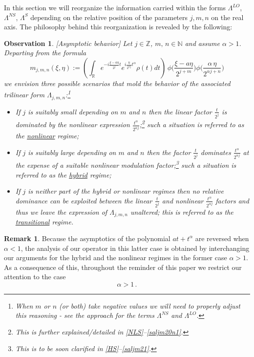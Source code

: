 \documentclass[a4paper,reqno]{amsart}
\numberwithin{equation}{section}
\newtheorem{observation}[theorem]{Observation}
\theoremstyle{definition}
\newtheorem{remark}[theorem]{Remark}
\newcommand{\R}{\mathbb{R}}
\newcommand{\Z}{\mathbb{Z}}
\newcommand{\N}{\mathbb{N}}
\def\a{\alpha}
\def\L{\Lambda}
\begin{document}
In this section we will reorganize the information carried within the forms $\L^{LO}$, $\L^{NS}$, $\L^{S}$ depending on the relative position of the parameters $j,m,n$ on the real axis. The philosophy behind this reorganization is revealed by the following:
\begin{observation}\label{dominance}[\textsf{Asymptotic behavior}] Let $j\in\Z$, $m,\,n\in\N$ and assume $\a>1$. Departing from the formula
\begin{equation}\label{mjmn}
	m_{j,m,n}(\xi,\eta):=\left(\int_\R e^{-i\frac{\xi-a\eta}{2^j}  t}e^{i\frac{\eta}{2^{\a j}}t^\a}\rho(t)dt\right)\,\phi\Big(\frac{\xi-a\eta}{2^{j+m}}\Big)\phi\Big(\frac{\a\,\eta}{2^{\a j+n}}\Big)
\end{equation}
we envision three possible scenarios that mold the behavior of the associated trilinear form $\L_{j,m,n}$:\footnote{When $m$ or $n$ (or both) take negative values we will need to properly adjust this reasoning - see the approach for the terms $\L^{NS}$ and $\L^{LO}$.}
\begin{itemize}
		\item  If $j$ is suitably small depending on $m$ and $n$ then the linear factor $\frac{t}{2^j}$ is dominated by the nonlinear expression $\frac{t^\a}{2^{\a j}}$;\footnote{This is further explained/detailed in \eqref{NLS}--\eqref{saljm20n1}.} such a situation is referred to as the \underline{nonlinear} regime;
        \item If $j$ is suitably large depending on $m$ and $n$ then the factor $\frac{t}{2^j}$ dominates $\frac{t^\a}{2^{\a j}}$ at the expense of a suitable nonlinear modulation factor;\footnote{This is to be soon clarified in \eqref{HS}--\eqref{saljm21}.} such a situation is referred to as the \underline{hybrid} regime;
        \item  If $j$ is neither part of the hybrid or nonlinear regimes then no relative dominance can be exploited between the linear $\frac{t}{2^j}$ and nonlinear $\frac{t^\a}{2^{\a j}}$ factors and thus we leave the expression of $\L_{j,m,n}$ unaltered;  this is referred to as the \underline{transitional} regime.
	\end{itemize}
\end{observation}

\begin{remark}\label{settlealpha} Because the asymptotics of the polynomial $at+t^\a$ are reversed when $\a<1$, the analysis of our operator in this latter case is obtained by interchanging our arguments for the hybrid and the nonlinear regimes in the former case $\a>1$. As a consequence of this, throughout the reminder of this paper we restrict our attention to the case
	\begin{equation}\label{al}
		\a>1\,.
	\end{equation}
\end{remark}
\end{document}
